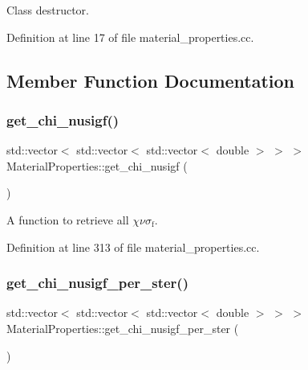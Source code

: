 Class destructor. 



Definition at line 17 of file material\+\_\+properties.\+cc.



\subsection{Member Function Documentation}
\mbox{\label{class_material_properties_a85d99311c0e1ed1991e79cc6115f0403}} 
\subsubsection{\texorpdfstring{get\+\_\+chi\+\_\+nusigf()}{get\_chi\_nusigf()}}
{\footnotesize\ttfamily std\+::vector$<$ std\+::vector$<$ std\+::vector$<$ double $>$ $>$ $>$ Material\+Properties\+::get\+\_\+chi\+\_\+nusigf (\begin{DoxyParamCaption}{ }\end{DoxyParamCaption})}



A function to retrieve all $\chi\nu\sigma_\mathrm{f}$. 



Definition at line 313 of file material\+\_\+properties.\+cc.

\mbox{\label{class_material_properties_a262e19465017da2dcd8acb02a2bcd5df}} 
\subsubsection{\texorpdfstring{get\+\_\+chi\+\_\+nusigf\+\_\+per\+\_\+ster()}{get\_chi\_nusigf\_per\_ster()}}
{\footnotesize\ttfamily std\+::vector$<$ std\+::vector$<$ std\+::vector$<$ double $>$ $>$ $>$ Material\+Properties\+::get\+\_\+chi\+\_\+nusigf\+\_\+per\+\_\+ster (\begin{DoxyParamCaption}{ }\end{DoxyParamCaption})}



